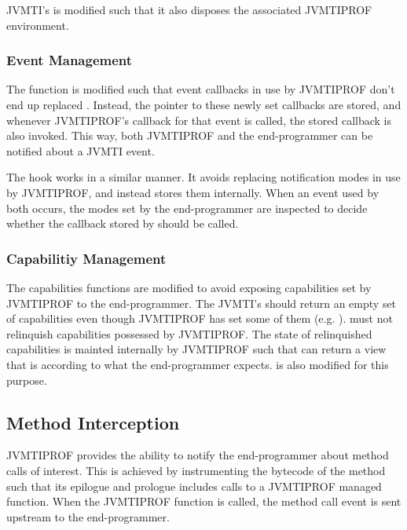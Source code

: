 JVMTI's  is modified such that it also disposes the associated JVMTIPROF environment.

\subsubsection*{Event Management}

The  function is modified such that event callbacks in use by JVMTIPROF don't end up replaced . Instead, the pointer to these newly set callbacks are stored, and whenever JVMTIPROF's callback for that event is called, the stored callback is also invoked. This way, both JVMTIPROF and the end-programmer can be notified about a JVMTI event.

The  hook works in a similar manner. It avoids replacing notification modes in use by JVMTIPROF, and instead stores them internally. When an event used by both occurs, the modes set by the end-programmer are inspected to decide whether the callback stored by  should be called.

\subsubsection*{Capabilitiy Management}

The capabilities functions are modified to avoid exposing capabilities set by JVMTIPROF to the end-programmer. The JVMTI's  should return an empty set of capabilities even though JVMTIPROF has set some of them (e.g. ).  must not relinquish capabilities possessed by JVMTIPROF. The state of relinquished capabilities is mainted internally by JVMTIPROF such that  can return a view that is according to what the end-programmer expects.  is also modified for this purpose.


\subsection{Method Interception}

JVMTIPROF provides the ability to notify the end-programmer about method calls of interest. This is achieved by instrumenting the bytecode of the method such that its epilogue and prologue includes calls to a JVMTIPROF managed function. When the JVMTIPROF function is called, the method call event is sent upstream to the end-programmer.

